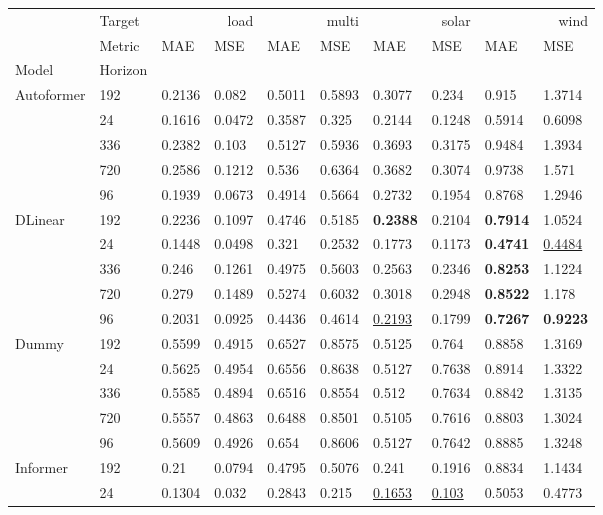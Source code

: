 \begin{tabular}{llllllllll}
\toprule
 & Target & \multicolumn{2}{r}{load} & \multicolumn{2}{r}{multi} & \multicolumn{2}{r}{solar} & \multicolumn{2}{r}{wind} \\
 & Metric & MAE & MSE & MAE & MSE & MAE & MSE & MAE & MSE \\
Model & Horizon &  &  &  &  &  &  &  &  \\
\midrule
\multirow[t]{5}{*}{Autoformer} & 192 & 0.2136 & 0.082 & 0.5011 & 0.5893 & 0.3077 & 0.234 & 0.915 & 1.3714 \\
 & 24 & 0.1616 & 0.0472 & 0.3587 & 0.325 & 0.2144 & 0.1248 & 0.5914 & 0.6098 \\
 & 336 & 0.2382 & 0.103 & 0.5127 & 0.5936 & 0.3693 & 0.3175 & 0.9484 & 1.3934 \\
 & 720 & 0.2586 & 0.1212 & 0.536 & 0.6364 & 0.3682 & 0.3074 & 0.9738 & 1.571 \\
 & 96 & 0.1939 & 0.0673 & 0.4914 & 0.5664 & 0.2732 & 0.1954 & 0.8768 & 1.2946 \\
\cline{1-10}
\multirow[t]{5}{*}{DLinear} & 192 & 0.2236 & 0.1097 & 0.4746 & 0.5185 & \textbf{0.2388} & 0.2104 & \textbf{0.7914} & 1.0524 \\
 & 24 & 0.1448 & 0.0498 & 0.321 & 0.2532 & 0.1773 & 0.1173 & \textbf{0.4741} & \underline{0.4484} \\
 & 336 & 0.246 & 0.1261 & 0.4975 & 0.5603 & 0.2563 & 0.2346 & \textbf{0.8253} & 1.1224 \\
 & 720 & 0.279 & 0.1489 & 0.5274 & 0.6032 & 0.3018 & 0.2948 & \textbf{0.8522} & 1.178 \\
 & 96 & 0.2031 & 0.0925 & 0.4436 & 0.4614 & \underline{0.2193} & 0.1799 & \textbf{0.7267} & \textbf{0.9223} \\
\cline{1-10}
\multirow[t]{5}{*}{Dummy} & 192 & 0.5599 & 0.4915 & 0.6527 & 0.8575 & 0.5125 & 0.764 & 0.8858 & 1.3169 \\
 & 24 & 0.5625 & 0.4954 & 0.6556 & 0.8638 & 0.5127 & 0.7638 & 0.8914 & 1.3322 \\
 & 336 & 0.5585 & 0.4894 & 0.6516 & 0.8554 & 0.512 & 0.7634 & 0.8842 & 1.3135 \\
 & 720 & 0.5557 & 0.4863 & 0.6488 & 0.8501 & 0.5105 & 0.7616 & 0.8803 & 1.3024 \\
 & 96 & 0.5609 & 0.4926 & 0.654 & 0.8606 & 0.5127 & 0.7642 & 0.8885 & 1.3248 \\
\cline{1-10}
\multirow[t]{5}{*}{Informer} & 192 & 0.21 & 0.0794 & 0.4795 & 0.5076 & 0.241 & 0.1916 & 0.8834 & 1.1434 \\
 & 24 & 0.1304 & 0.032 & 0.2843 & 0.215 & \underline{0.1653} & \underline{0.103} & 0.5053 & 0.4773 \\

\end{tabular}
